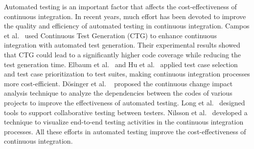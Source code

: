 Automated testing is an important factor that affects the cost-effectiveness of continuous integration. In recent years, much effort has been devoted to improve the quality and efficiency of automated testing in continuous integration. Campos et al.~\cite{campos2014continuous} used Continuous Test Generation (CTG) to enhance continuous integration with automated test generation. Their experimental results showed that CTG could lead to a significantly higher code coverage while reducing the test generation time. Elbaum et al.~\cite{elbaum2014techniques} and Hu et al.~\cite{hu2016Implementation} applied test case selection and test case prioritization to test suites, making continuous integration processes more cost-efficient. D{\"o}singer et al. ~\cite{dosinger2012communicating} proposed the continuous change impact analysis technique to analyze the dependencies between the codes of various projects to improve the effectiveness of automated testing. Long et al.~\cite{long2015collaborative} designed tools to support collaborative testing between testers. Nilsson et al.~\cite{nilsson2014visualizing} developed a technique to visualize end-to-end testing activities in the continuous integration processes. All these efforts in automated testing improve the cost-effectiveness of continuous integration. 

 